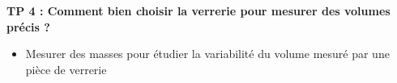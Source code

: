 
\renewcommand{\thesubsection}{\textcolor{red}{\Roman{section}.\arabic{subsection}}}
\renewcommand{\thesubsubsection}{\textcolor{red}{\Roman{section}.\arabic{subsection}.\alph{subsubsection}}}

\setcounter{section}{0}
\setcounter{document}{0}
\sndEnTeteTPQuatre

\begin{center}
\begin{mdframed}[style=titr, leftmargin=60pt, rightmargin=60pt, innertopmargin=7pt, innerbottommargin=7pt, innerrightmargin=8pt, innerleftmargin=8pt]

\begin{center}
\large{\textbf{TP 4 : Comment bien choisir la verrerie pour mesurer des volumes précis ?}}
\end{center}


\end{mdframed}
\end{center}

    

\begin{tcolorbox}[colback=blue!5!white,colframe=blue!75!black,title=Objectifs de la séance :]
\begin{itemize}
    \item Mesurer des masses pour étudier la variabilité du volume mesuré par une pièce de verrerie
\end{itemize}
\end{tcolorbox}


